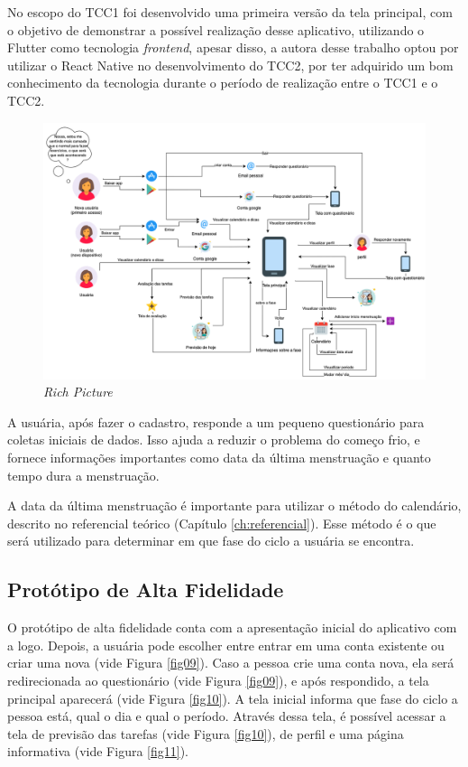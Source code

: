No escopo do TCC1 foi desenvolvido uma primeira versão da tela principal, com o objetivo de demonstrar a possível 
realização desse aplicativo, utilizando o Flutter como tecnologia \emph{frontend}, apesar disso, a autora desse trabalho 
optou por utilizar o React Native no desenvolvimento do TCC2, por ter adquirido um bom conhecimento da tecnologia durante o período de realização entre o TCC1 e o TCC2.
 
\begin{figure}[ht]
    \centering
    \includegraphics[keepaspectratio=true,scale=0.37]{figuras/richPicture.png}
    \caption{\emph{Rich Picture}}
        \label{fig08}
\end{figure}

A usuária, após fazer o cadastro, responde a um pequeno 
questionário para coletas iniciais de dados. Isso ajuda a reduzir 
o problema do começo frio, e fornece informações importantes
como data da última menstruação e quanto tempo dura a menstruação.

A data da última menstruação é importante para utilizar o 
método do calendário, descrito no referencial teórico (Capítulo \ref{ch:referencial}). 
Esse método é o que será utilizado para determinar em que 
fase do ciclo a usuária se encontra.

\subsection{Protótipo de Alta Fidelidade}

O protótipo de alta fidelidade conta com a apresentação 
inicial do aplicativo com a logo. Depois, a usuária 
pode escolher entre entrar em uma conta existente ou criar 
uma nova (vide Figura \ref{fig09}). Caso a pessoa crie uma conta 
nova, ela será 
redirecionada ao questionário (vide Figura \ref{fig09}), e após 
respondido, a 
tela principal aparecerá (vide Figura \ref{fig10}). A tela inicial informa que 
fase do ciclo a pessoa está, qual o dia 
e qual o período. Através dessa tela, é possível acessar 
a tela de previsão das tarefas (vide Figura \ref{fig10}), de perfil
e uma página informativa (vide Figura \ref{fig11}).


